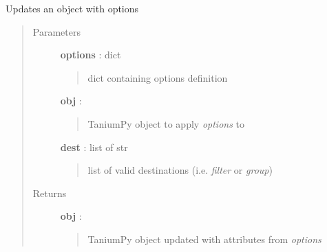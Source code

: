 \documentclass[letterpaper,10pt,english]{sphinxmanual}
\begin{document}
\begin{fulllineitems}
\label{pytan.utils:pytan.utils.apply_options_obj}
Updates an object with options
\begin{quote}\begin{description}
\item[{Parameters}] \leavevmode
\textbf{options} : dict
\begin{quote}

dict containing options definition
\end{quote}

\textbf{obj} : {\hyperref[taniumpy.object_types:taniumpy.object_types.base.BaseType]{}}
\begin{quote}

TaniumPy object to apply \emph{options} to
\end{quote}

\textbf{dest} : list of str
\begin{quote}

list of valid destinations (i.e. \emph{filter} or \emph{group})
\end{quote}

\item[{Returns}] \leavevmode
\textbf{obj} : {\hyperref[taniumpy.object_types:taniumpy.object_types.base.BaseType]{}}
\begin{quote}

TaniumPy object updated with attributes from \emph{options}
\end{quote}

\end{description}\end{quote}

\end{fulllineitems}

\end{document}
